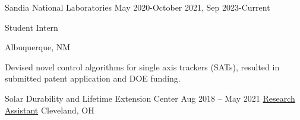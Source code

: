 \documentclass[10pt]{article}
\begin{document}
{    
\vspace{0.25cm}

	\job
{Sandia National Laboratories}
{May 2020-October 2021, Sep 2023-Current}
{
	
	Student Intern
}
{Albuquerque, NM}
\


{\begin{newitemize}
		\item Devised novel control algorithms for single axis trackers (SATs), resulted in submitted patent application and DOE funding.
\end{newitemize}}


\vspace{0.25cm}
	\job
	{Solar Durability and Lifetime Extension Center}
	{Aug 2018 – May 2021}
	{\href{https://engineering.case.edu/centers/sdle/ben-pierce}{Research Assistant}}
	{Cleveland, OH}
	\
	
}
\end{document}
